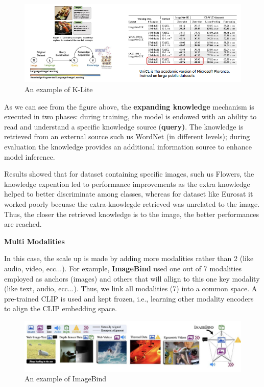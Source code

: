 \begin{figure}[H]
    \centering
    \includegraphics[width=1\linewidth]{tikz/K-Lite.png}
    \caption{An example of K-Lite}
    \label{fig:K-Lite}
\end{figure}

As we can see from the figure above, the \textbf{expanding knowledge} mechanism is executed in two phases: during training, the model is endowed with an ability to read and understand a specific knowledge source (\textbf{query)}. The knowledge is retrieved from an external source such us WordNet (in different levels); during evaluation the knowledge provides an additional information source to enhance model inference.

Results showed that for dataset containing specific images, such us Flowers, the knowledge expention  led to performance improvements as the extra knowledge helped to better discriminate among classes, whereas for dataset like Eurosat it worked poorly becuase the extra-knowlegde retrieved was unrelated to the image. Thus, the closer the retrieved knowledge is to the image, the better performances are reached.


\textbf{Multi Modalities}

In this case, the scale up is made by adding more modalities rather than 2 (like audio, video, ecc...). For example,  \textbf{ImageBind} used one out of 7 modalities employed as anchors (images) and others that will allign to this one key modality (like text, audio, ecc...).  Thus, we link all modalities (7) into a common space. A pre-trained CLIP is used and kept frozen, i.e., learning other modality encoders to align the CLIP embedding space.


\begin{figure}[H]
    \centering
    \includegraphics[width=1\linewidth]{tikz/ImageBinf.png}
    \caption{An example of ImageBind}
    \label{fig:ImageBind}
\end{figure}


